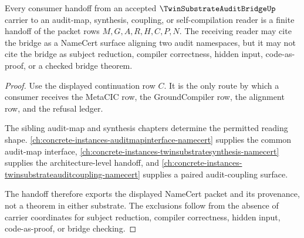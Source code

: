 \begin{theorem}
\label{thm:twin-substrate-audit-bridge-consumer-handoff}
Every consumer handoff from an accepted $\TwinSubstrateAuditBridgeUp$ carrier to an audit-map, synthesis, coupling, or self-compilation reader is a finite handoff of the packet rows $M,G,A,R,H,C,P,N$. The receiving reader may cite the bridge as a NameCert surface aligning two audit namespaces, but it may not cite the bridge as subject reduction, compiler correctness, hidden input, code-as-proof, or a checked bridge theorem.
\end{theorem}
\begin{proof}
Use the displayed continuation row $C$. It is the only route by which a consumer receives the MetaCIC row, the GroundCompiler row, the alignment row, and the refusal ledger.

The sibling audit-map and synthesis chapters determine the permitted reading shape. \autoref{ch:concrete-instances-auditmapinterface-namecert} supplies the common audit-map interface, \autoref{ch:concrete-instances-twinsubstratesynthesis-namecert} supplies the architecture-level handoff, and \autoref{ch:concrete-instances-twinsubstrateauditcoupling-namecert} supplies a paired audit-coupling surface.

The handoff therefore exports the displayed NameCert packet and its provenance, not a theorem in either substrate. The exclusions follow from the absence of carrier coordinates for subject reduction, compiler correctness, hidden input, code-as-proof, or bridge checking.
\end{proof}


\begin{closurestatus}{\TwinSubstrateAuditBridgeUp}
  \theoryclosure{\seedClosure}
  \formalstatus{\unformalizedV}
\end{closurestatus}

